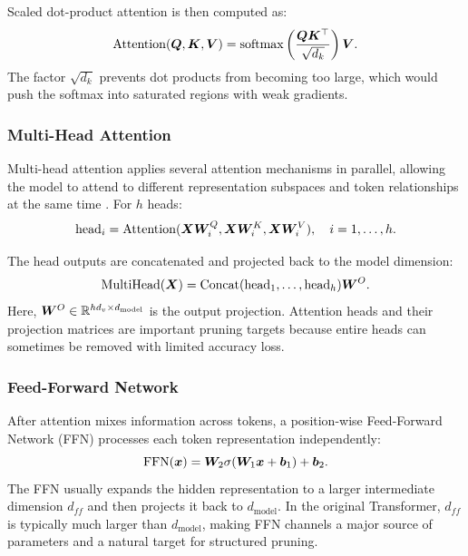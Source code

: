 Scaled dot-product attention is then computed as:
\begin{equation}
    \operatorname{Attention}(\bm{Q}, \bm{K}, \bm{V})
    =
    \operatorname{softmax}\left(\frac{\bm{Q}\bm{K}^{\top}}{\sqrt{d_k}}\right)\bm{V}.
\end{equation}
The factor $\sqrt{d_k}$ prevents dot products from becoming too large, which would push the softmax into saturated regions with weak gradients.

\subsubsection{Multi-Head Attention}

Multi-head attention applies several attention mechanisms in parallel, allowing the model to attend to different representation subspaces and token relationships at the same time \cite{vaswani2017attention}. For $h$ heads:
\begin{equation}
    \operatorname{head}_i =
    \operatorname{Attention}(\bm{X}\bm{W}^{Q}_{i}, \bm{X}\bm{W}^{K}_{i}, \bm{X}\bm{W}^{V}_{i}),
    \quad i = 1,\ldots,h.
\end{equation}

The head outputs are concatenated and projected back to the model dimension:
\begin{equation}
    \operatorname{MultiHead}(\bm{X}) =
    \operatorname{Concat}(\operatorname{head}_1,\ldots,\operatorname{head}_h)\bm{W}^{O}.
\end{equation}
Here, $\bm{W}^{O} \in \mathbb{R}^{hd_v \times d_{\text{model}}}$ is the output projection. Attention heads and their projection matrices are important pruning targets because entire heads can sometimes be removed with limited accuracy loss.

\subsubsection{Feed-Forward Network}

After attention mixes information across tokens, a position-wise Feed-Forward Network (FFN) processes each token representation independently:
\begin{equation}
    \operatorname{FFN}(\bm{x}) = \bm{W}_2 \sigma(\bm{W}_1\bm{x} + \bm{b}_1) + \bm{b}_2.
\end{equation}
The FFN usually expands the hidden representation to a larger intermediate dimension $d_{ff}$ and then projects it back to $d_{\text{model}}$. In the original Transformer, $d_{ff}$ is typically much larger than $d_{\text{model}}$, making FFN channels a major source of parameters and a natural target for structured pruning.

